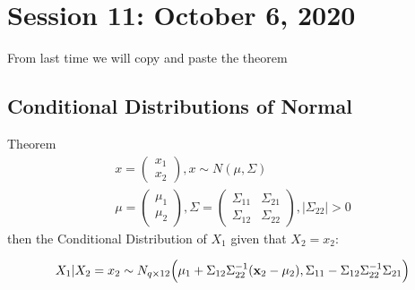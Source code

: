 \chapter{Session 11: October 6, 2020}
From last time we will copy and paste the theorem


\section{Conditional Distributions of Normal}

Theorem
\begin{gather*}
    x = \begin{pmatrix}
    x_1 \\
    x_2
    \end{pmatrix}, x \sim N(\mu,\Sigma)\\
    \mu = \begin{pmatrix}
    \mu_1 \\
    \mu_2
    \end{pmatrix} ,
    \Sigma = 
    \begin{pmatrix}
    \Sigma_{11} & \Sigma_{21} \\
    \Sigma_{12} & \Sigma_{22}
    \end{pmatrix}, |\Sigma_22| >0
\end{gather*}
then the Conditional Distribution of $X_1$ given that $X_2 = x_2$:

\[X_1|X_2=x_2 \sim N_{q\times 12}\Big( \mu_1 + \Sigma_{12}\Sigma_{22}^{-1}(\mathbf{x}_2-\mu_2), \Sigma_{11}-\Sigma_{12}\Sigma_{22}^{-1}\Sigma_{21}\Big)\]

